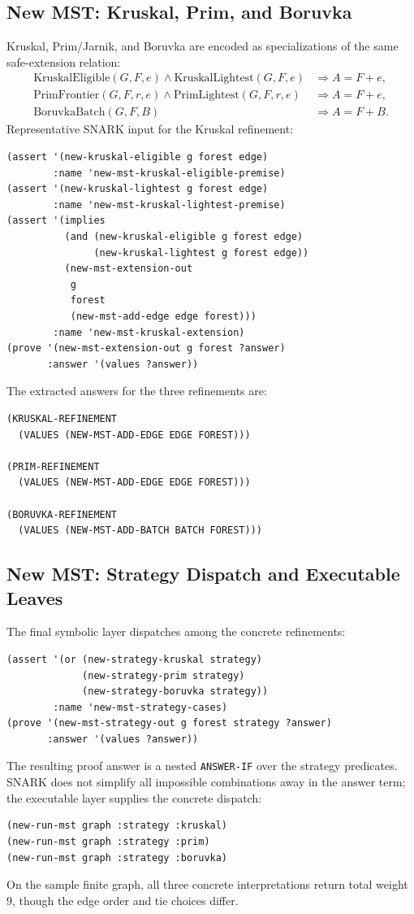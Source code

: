 \documentclass[runningheads]{llncs}
\begin{document}
\subsection{New MST: Kruskal, Prim, and Boruvka}

Kruskal, Prim/Jarnik, and Boruvka are encoded as specializations of the same
safe-extension relation:
\begin{align*}
  \mathrm{KruskalEligible}(G,F,e)\land\mathrm{KruskalLightest}(G,F,e)
    &\Rightarrow A=F+e,\\
  \mathrm{PrimFrontier}(G,F,r,e)\land\mathrm{PrimLightest}(G,F,r,e)
    &\Rightarrow A=F+e,\\
  \mathrm{BoruvkaBatch}(G,F,B)
    &\Rightarrow A=F+B.
\end{align*}
Representative SNARK input for the Kruskal refinement:
\begin{lstlisting}
(assert '(new-kruskal-eligible g forest edge)
        :name 'new-mst-kruskal-eligible-premise)
(assert '(new-kruskal-lightest g forest edge)
        :name 'new-mst-kruskal-lightest-premise)
(assert '(implies
          (and (new-kruskal-eligible g forest edge)
               (new-kruskal-lightest g forest edge))
          (new-mst-extension-out
           g
           forest
           (new-mst-add-edge edge forest)))
        :name 'new-mst-kruskal-extension)
(prove '(new-mst-extension-out g forest ?answer)
       :answer '(values ?answer))
\end{lstlisting}
The extracted answers for the three refinements are:
\begin{lstlisting}
(KRUSKAL-REFINEMENT
  (VALUES (NEW-MST-ADD-EDGE EDGE FOREST)))

(PRIM-REFINEMENT
  (VALUES (NEW-MST-ADD-EDGE EDGE FOREST)))

(BORUVKA-REFINEMENT
  (VALUES (NEW-MST-ADD-BATCH BATCH FOREST)))
\end{lstlisting}

\subsection{New MST: Strategy Dispatch and Executable Leaves}

The final symbolic layer dispatches among the concrete refinements:
\begin{lstlisting}
(assert '(or (new-strategy-kruskal strategy)
             (new-strategy-prim strategy)
             (new-strategy-boruvka strategy))
        :name 'new-mst-strategy-cases)
(prove '(new-mst-strategy-out g forest strategy ?answer)
       :answer '(values ?answer))
\end{lstlisting}
The resulting proof answer is a nested \texttt{ANSWER-IF} over the strategy
predicates.  SNARK does not simplify all impossible combinations away in the
answer term; the executable layer supplies the concrete dispatch:
\begin{lstlisting}
(new-run-mst graph :strategy :kruskal)
(new-run-mst graph :strategy :prim)
(new-run-mst graph :strategy :boruvka)
\end{lstlisting}
On the sample finite graph, all three concrete interpretations return total
weight \(9\), though the edge order and tie choices differ.
\end{document}
